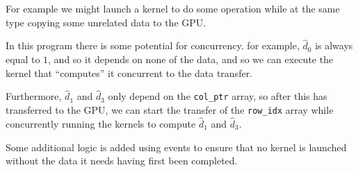 \documentclass[10pt, a4paper]{article}
\begin{document}
For example we might launch a kernel to do some operation while at the same type copying some unrelated data
to the GPU.

In this program there is some potential for concurrency. for example, $\hat{d}_0$ is always equal to $1$,
and so it depends on none of the data, and so we can execute the kernel that ``computes'' it concurrent
to the data transfer.

Furthermore, $\hat{d}_1$ and $\hat{d}_3$ only depend on the \verb|col_ptr| array, so after this has transferred
to the GPU, we can start the transfer of the \verb|row_idx| array while concurrently running the kernels
to compute $\hat{d}_1$ and $\hat{d}_3$.

Some additional logic is added using events to ensure that no kernel is launched without the data it needs
having first been completed.

\printbibliography
\end{document}
